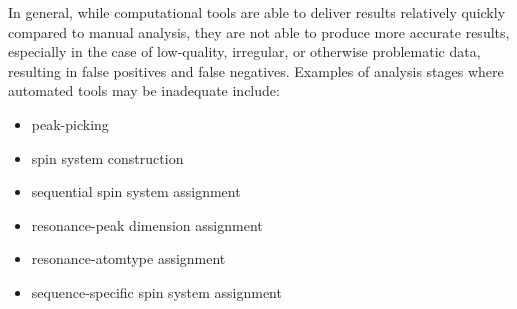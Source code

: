 \documentclass[a4paper]{report}
\begin{document}
In general, while computational tools are able to deliver results relatively 
quickly compared to manual analysis, they are not able to produce more 
accurate results, especially in the case of low-quality, irregular, or 
otherwise problematic data, resulting in false positives and false 
negatives.  Examples of analysis stages where automated tools may be 
inadequate include:
\begin{itemize}
 \item peak-picking
 \item spin system construction
 \item sequential spin system assignment
 \item resonance-peak dimension assignment
 \item resonance-atomtype assignment
 \item sequence-specific spin system assignment
\end{itemize}
\end{document}
